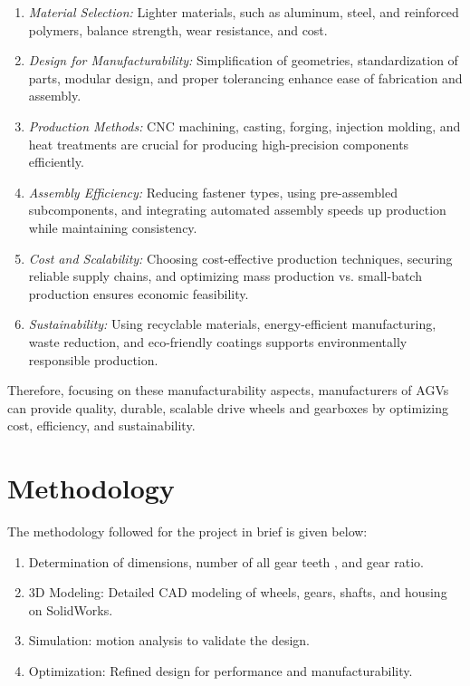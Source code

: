 \documentclass[../../main]{subfiles}
\begin{document}
\begin{enumerate}
    \item \textit{Material Selection:} Lighter materials, such as aluminum, steel, and reinforced polymers, balance strength, wear resistance, and cost.
    
    \item \textit{Design for Manufacturability:} Simplification of geometries, standardization of parts, modular design, and proper tolerancing enhance ease of fabrication and assembly.
    
    \item \textit{Production Methods:} CNC machining, casting, forging, injection molding, and heat treatments are crucial for producing high-precision components efficiently.
    
    \item \textit{Assembly Efficiency:} Reducing fastener types, using pre-assembled subcomponents, and integrating automated assembly speeds up production while maintaining consistency.
    
    \item \textit{Cost and Scalability:} Choosing cost-effective production techniques, securing reliable supply chains, and optimizing mass production vs. small-batch production ensures economic feasibility.
    
    \item \textit{Sustainability:} Using recyclable materials, energy-efficient manufacturing, waste reduction, and eco-friendly coatings supports environmentally responsible production.
\end{enumerate}

Therefore, focusing on these manufacturability aspects, manufacturers of AGVs can provide quality, durable, scalable drive wheels and gearboxes by optimizing cost, efficiency, and sustainability.


\section{Methodology}

The methodology followed for the project in brief is given below:

\begin{enumerate}
\def\labelenumi{\arabic{enumi}.}
\item
  Determination of dimensions, number of all gear teeth , and gear
  ratio.
\item
  3D Modeling: Detailed CAD modeling of wheels, gears, shafts, and
  housing on SolidWorks.
\item
  Simulation: motion analysis to validate the design.
\item
  Optimization: Refined design for performance and manufacturability.
\end{enumerate}
\end{document}
